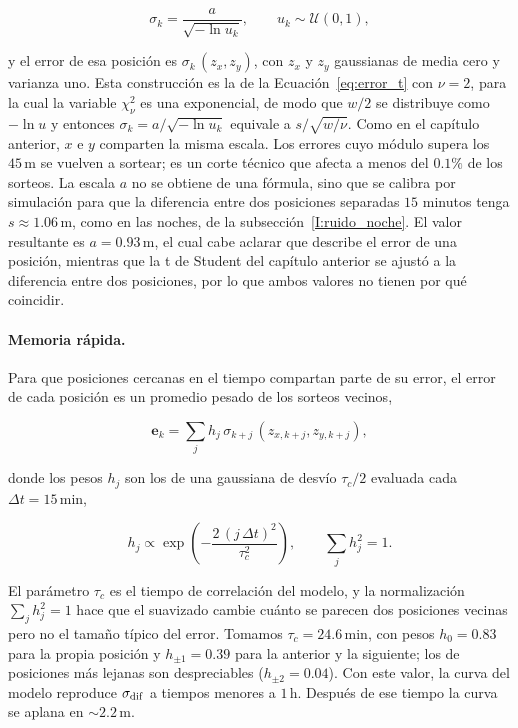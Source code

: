 \begin{equation}
    \sigma_k=\frac{a}{\sqrt{-\ln u_k}}, \qquad u_k\sim\mathcal{U}(0,1),
    \label{eq:sigma_k}
\end{equation}

y el error de esa posición es $\sigma_k\,(z_x,z_y)$, con $z_x$ y $z_y$ gaussianas de media cero y varianza uno. Esta construcción es la de la Ecuación~\eqref{eq:error_t}
con $\nu=2$, para la cual la variable $\chi^2_\nu$ es una exponencial, de modo que $w/2$ se distribuye como $-\ln u$ y entonces $\sigma_k=a/\sqrt{-\ln u_k}$ equivale a 
$s/\sqrt{w/\nu}$. Como en el capítulo anterior, $x$ e $y$ comparten la misma escala. Los errores cuyo módulo supera los $45\,\mathrm{m}$ se vuelven a sortear; 
es un corte técnico que afecta a menos del $0.1\%$ de los sorteos. La escala $a$ no se obtiene de una fórmula, sino que se calibra por simulación para que la
diferencia entre dos posiciones separadas $15$ minutos tenga $s\approx1.06\,\mathrm{m}$, como en las noches, de la subsección~\ref{I:ruido_noche}. 
El valor resultante es $a=0.93\,\mathrm{m}$, el cual cabe aclarar que describe el error de una posición, mientras que la t de Student del capítulo anterior 
se ajustó a la diferencia entre dos posiciones, por lo que ambos valores no tienen por qué coincidir.

\paragraph{Memoria rápida.} Para que posiciones cercanas en el tiempo compartan parte de su error, el error de cada posición es un promedio pesado de los sorteos vecinos,

\begin{equation}
    \boldsymbol{e}_k=\sum_{j} h_j\,\sigma_{k+j}\,(z_{x,k+j},z_{y,k+j}),
    \label{eq:suavizado}
\end{equation}

donde los pesos $h_j$ son los de una gaussiana de desvío $\tau_c/2$ evaluada cada $\Delta t=15\,\mathrm{min}$,

\begin{equation}
    h_j\propto\exp\!\left(-\frac{2\,(j\,\Delta t)^2}{\tau_c^2}\right),\qquad \sum_j h_j^2=1 .
\end{equation}

El parámetro $\tau_c$ es el tiempo de correlación del modelo, y la normalización $\sum_j h_j^2=1$ hace que el suavizado cambie cuánto se parecen dos posiciones 
vecinas pero no el tamaño típico del error. Tomamos $\tau_c=24.6\,\mathrm{min}$, con pesos 
$h_0=0.83$ para la propia posición y $h_{\pm1}=0.39$ para la anterior y la siguiente; los de posiciones más lejanas son despreciables ($h_{\pm2}=0.04$). Con este valor, 
la curva del modelo reproduce $\sigma_{\rm dif}$ a tiempos menores a $1\,\mathrm{h}$. Después de ese tiempo la curva se aplana en $\sim2.2\,\mathrm{m}$.

